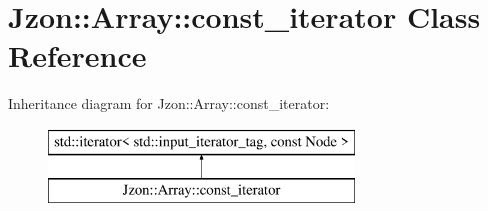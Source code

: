 \hypertarget{class_jzon_1_1_array_1_1const__iterator}{\section{Jzon\-:\-:Array\-:\-:const\-\_\-iterator Class Reference}
\label{class_jzon_1_1_array_1_1const__iterator}
}
Inheritance diagram for Jzon\-:\-:Array\-:\-:const\-\_\-iterator\-:\begin{figure}[H]
\begin{center}
\leavevmode
\includegraphics[height=2.000000cm]{class_jzon_1_1_array_1_1const__iterator}
\end{center}
\end{figure}
